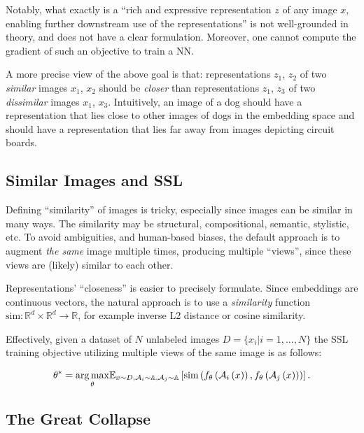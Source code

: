 Notably, what exactly is a ``rich and expressive representation $z$ of any image $x$, enabling further downstream use of the representations'' is not well-grounded in theory, and does not have a clear formulation. Moreover, one cannot compute the gradient of such an objective to train a NN. 

A more precise view of the above goal is that: representations $z_1$, $z_2$ of two \textit{similar} images $x_1$, $x_2$ should be \textit{closer} than representations $z_1$, $z_3$ of two \textit{dissimilar} images $x_1$, $x_3$. Intuitively, an image of a dog should have a representation that lies close to other images of dogs in the embedding space and should have a representation that lies far away from images depicting circuit boards. 

\subsection{Similar Images and SSL}\label{sec:similar_imgs_ssl}

Defining ``similarity'' of images is tricky, especially since images can be similar in many ways. The similarity may be structural, compositional, semantic, stylistic, etc. To avoid ambiguities, and human-based biases, the default approach is to augment \textit{the same} image multiple times, producing multiple ``views'', since these views are (likely) similar to each other.

Representations' ``closeness'' is easier to precisely formulate. Since embeddings are continuous vectors, the natural approach is to use a \textit{similarity} function $\text{sim}: \mathbb{R}^d\times\mathbb{R}^d\rightarrow\mathbb{R}$, for example inverse L2 distance or cosine similarity. 

Effectively, given a dataset of $N$ unlabeled images $D=\{x_i|i=1,...,N\}$ the SSL training objective utilizing multiple views of the same image is as follows:

\begin{equation}
    \theta^*=\underset{\theta}{\operatorname*{arg\,max}}
    \mathbb{E}_{x\sim D,\mathcal{A}_i\sim{\mathbb{A}},\mathcal{A}_j\sim\mathbb{A}}
        \left[\text{sim}\left(
            f_\theta\left(\mathcal{A}_i\left(x\right)\right),
            f_\theta\left(\mathcal{A}_j\left(x\right)\right)
        \right)\right]\text{.}
    \label{eq:loss_ssl_sim}
\end{equation}

\subsection{The Great Collapse}\label{sec:ssl_collapse}

